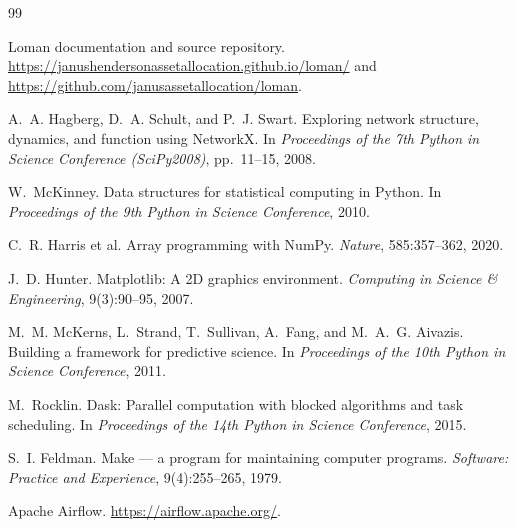 \documentclass[11pt,a4paper]{article}
\begin{document}
\begin{thebibliography}{99}

Loman documentation and source repository.
\url{https://janushendersonassetallocation.github.io/loman/} and
\url{https://github.com/janusassetallocation/loman}.

A.~A. Hagberg, D.~A. Schult, and P.~J. Swart.
\newblock Exploring network structure, dynamics, and function using NetworkX.
\newblock In \emph{Proceedings of the 7th Python in Science Conference
  (SciPy2008)}, pp.~11--15, 2008.

W.~McKinney.
\newblock Data structures for statistical computing in Python.
\newblock In \emph{Proceedings of the 9th Python in Science Conference}, 2010.

C.~R. Harris et al.
\newblock Array programming with NumPy.
\newblock \emph{Nature}, 585:357--362, 2020.

J.~D. Hunter.
\newblock Matplotlib: A 2D graphics environment.
\newblock \emph{Computing in Science \& Engineering}, 9(3):90--95, 2007.

M.~M. McKerns, L.~Strand, T.~Sullivan, A.~Fang, and M.~A.~G. Aivazis.
\newblock Building a framework for predictive science.
\newblock In \emph{Proceedings of the 10th Python in Science Conference}, 2011.

M.~Rocklin.
\newblock Dask: Parallel computation with blocked algorithms and task
  scheduling.
\newblock In \emph{Proceedings of the 14th Python in Science Conference}, 2015.

S.~I. Feldman.
\newblock Make --- a program for maintaining computer programs.
\newblock \emph{Software: Practice and Experience}, 9(4):255--265, 1979.

Apache Airflow.
\newblock \url{https://airflow.apache.org/}.

\end{thebibliography}
\end{document}
